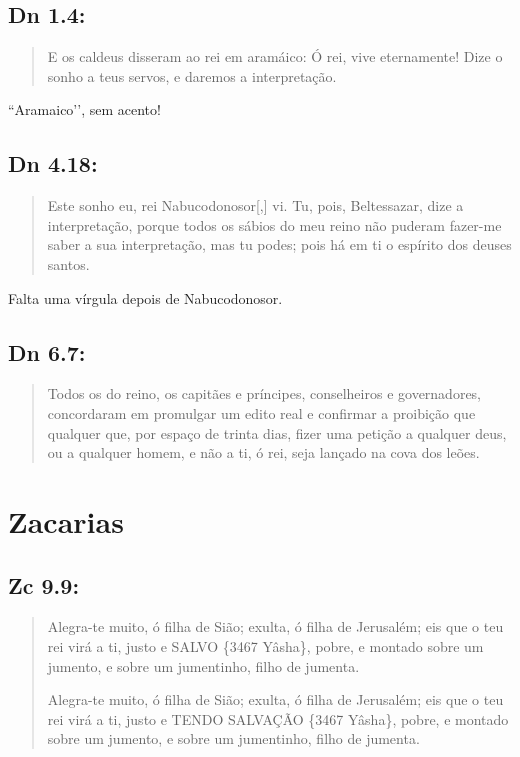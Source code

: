 \subsection*{Dn 1.4:} 
 \begin{quote}
  \small
E os caldeus disseram ao rei em aramáico: Ó rei, vive eternamente! Dize o sonho a teus servos, e daremos a interpretação.
 \end{quote}

``Aramaico’’, sem acento!

\subsection*{Dn 4.18:} 
 \begin{quote}
  \small
Este sonho eu, rei Nabucodonosor[,] vi. Tu, pois, Beltessazar, dize a interpretação, porque todos os sábios do meu reino não puderam fazer-me saber a sua interpretação, mas tu podes; pois há em ti o espírito dos deuses santos.
 \end{quote}
 
Falta uma vírgula depois de Nabucodonosor.

\subsection*{Dn 6.7:} 
 \begin{quote}
  \small
Todos os  do reino, os capitães e príncipes, conselheiros e governadores, concordaram em promulgar um edito real e confirmar a proibição que qualquer que, por espaço de trinta dias, fizer uma petição a qualquer deus, ou a qualquer homem, e não a ti, ó rei, seja lançado na cova dos leões.
 \end{quote}

\section{Zacarias}
\subsection*{Zc 9.9:} 
\begin{quote}
  \small
Alegra-te muito, ó filha de Sião; exulta, ó filha de Jerusalém; eis que o teu rei virá a ti, justo e SALVO \{3467 Yâsha\}, pobre, e montado sobre um jumento, e sobre um jumentinho, filho de jumenta.

Alegra-te muito, ó filha de Sião; exulta, ó filha de Jerusalém; eis que o teu rei virá a ti, justo e TENDO SALVAÇÃO \{3467 Yâsha\}, pobre, e montado sobre um jumento, e sobre um jumentinho, filho de jumenta.
\end{quote}

